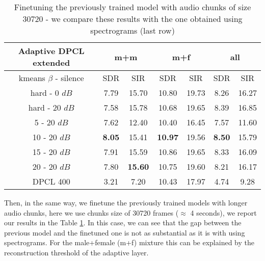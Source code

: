 \documentclass[master,final,11pt]{iscs-thesis}
\begin{document}
\begin{table}
\centering
\begin{tabular}{c|c|c|c|c|c|c}
Adaptive DPCL extended & \multicolumn{2}{c|}{m+m} & \multicolumn{2}{c|}{m+f} & \multicolumn{2}{c}{all} \\ 
\hline 
kmeans $\beta$ - silence & SDR & SIR & SDR & SIR & SDR & SIR \\ 
\hline 
hard - 0 $dB$ & 7.79 & 15.70 & 10.80 & 19.73 & 8.26 & 16.27 \\  
hard - 20 $dB$ & 7.58 & 15.78 & 10.68 & 19.65 & 8.39 & 16.85 \\ 
\hline 
\hline 
5 - 20 $dB$ & 7.62 & 12.40 & 10.40 & 16.45 & 7.57 & 11.60 \\ 
10 - 20 $dB$ & \textbf{8.05} & 15.41 & \textbf{10.97} & 19.56 & \textbf{8.50} & 15.79 \\ 
15 - 20 $dB$ & 7.91 & 15.59 & 10.86 & 19.65 & 8.33 & 16.09 \\ 
20 - 20 $dB$ & 7.80 & \textbf{15.60} & 10.75 & 19.60 & 8.21 & 16.17 \\ 
\hline 
\hline 
DPCL 400 & 3.21 & 7.20 & 10.43 & 17.97 & 4.74 & 9.28 \\ 
\end{tabular}
\captionsetup{justification=centering}
\caption{Finetuning the previously trained model with audio chunks of size 30720 - we compare these results with the one obtained using spectrograms (last row) }
\label{table:AdaptDPCLext}
\end{table}

Then, in the same way, we finetune the previously trained models with longer audio chunks, here we use chunks size of 30720 frames ($\approx$ 4 seconds), we report our results in the Table \ref{table:AdaptDPCLext}. In this case, we can see that the gap between the previous model and the finetuned one is not as substantial as it is with using spectrograms. For the male+female (m+f) mixture this can be explained by the reconstruction threshold of the adaptive layer.

\end{document}
